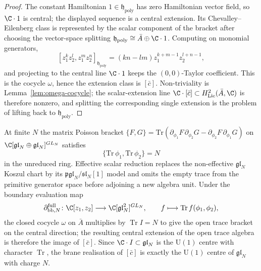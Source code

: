 \documentclass[11pt]{memoir}
\begin{document}
\begin{proof}
  The constant Hamiltonian $1\in\mathfrak h_{\mathrm{poly}}$ has zero
  Hamiltonian vector field, so $\C\cdot 1$ is central; the displayed
  sequence is a central extension.  Its Chevalley--Eilenberg class is
  represented by the scalar component of the bracket after choosing the
  vector-space splitting \(\mathfrak h_{\mathrm{poly}}\cong\bar A\oplus\C\cdot1\).
  Computing on monomial generators,
  $$[z_1^kz_2^l,z_1^mz_2^n]_{\mathfrak h_{\mathrm{poly}}}
    =(kn-lm)z_1^{k+m-1}z_2^{l+n-1},$$
  and projecting to the central line $\C\cdot 1$ keeps the
  $(0,0)$-Taylor coefficient.  This is the cocycle $\omega$, hence the
  extension class is $[\bar c]$.  Non-triviality is
  Lemma~\ref{lem:omega-cocycle}; the scalar-extension line
  $\C\cdot[\bar c]\subset H^2_{\mathrm{Lie}}(\bar A,\C)$ is therefore
  nonzero, and splitting the corresponding single extension is the
  problem of lifting back to $\mathfrak h_{\mathrm{poly}}$.
\end{proof}

\begin{thm}\label{thm:u1-center-anomaly-open}
  At finite $N$ the matrix Poisson bracket
  $\{F,G\}=\mathrm{Tr}(\partial_{\phi_1}F\,\partial_{\phi_2}G
  -\partial_{\phi_2}F\,\partial_{\phi_1}G)$ on
  $\C[\mathfrak{gl}_N\oplus\mathfrak{gl}_N]^{GL_N}$ satisfies
  $$\{\mathrm{Tr}\,\phi_1,\mathrm{Tr}\,\phi_2\}=N$$
  in the unreduced ring.  Effective scalar reduction replaces the
  non-effective \(\mathfrak{gl}_N\) Koszul chart by its
  \(\mathfrak{pgl}_N/\mathfrak{sl}_N[1]\) model and omits the empty
  trace from the primitive generator space before adjoining a new
  algebra unit.  Under the boundary
  evaluation map
  $$\partial_{\mathrm{bb},N}^{\mathrm{full}}\colon\C[z_1,z_2]\longrightarrow
    \C[\mathfrak{gl}_N^2]^{GL_N},\qquad
    f\longmapsto \mathrm{Tr}\,f(\phi_1,\phi_2),$$
  the closed cocycle $\omega$ on $\bar A$ multiplies by
  $\operatorname{Tr}I=N$ to give the open trace bracket on the central
  direction; the resulting central extension of the open trace algebra
  is therefore the image of $[\bar c]$.  Since
  $\C\cdot I\subset\mathfrak{gl}_N$ is the $\mathrm U(1)$ centre with character
  $\operatorname{Tr}$, the brane realisation of $[\bar c]$ is exactly
  the $\mathrm U(1)$ centre of $\mathfrak{gl}_N$ with charge $N$.
\end{thm}
\end{document}
